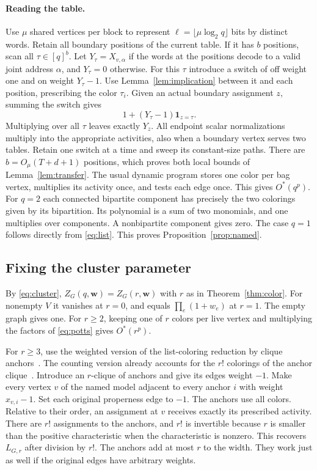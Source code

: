 \documentclass[11pt]{article}
\theoremstyle{definition}
\newcommand{\one}{\mathbf{1}}
\newcommand{\OO}{O^*}
\begin{document}
\paragraph{Reading the table.}
Use \(\mu\) shared vertices per block to represent \(\ell=\lfloor \mu\log_2 q\rfloor\) bits by distinct words. Retain all boundary positions of the current table. If it has \(b\) positions, scan all \(\tau\in[q]^b\). Let \(Y_\tau=X_{v,\alpha}\) if the words at the positions decode to a valid joint address \(\alpha\), and \(Y_\tau=0\) otherwise. For this \(\tau\) introduce a switch of off weight one and on weight \(Y_\tau-1\). Use Lemma~\ref{lem:implication} between it and each position, prescribing the color \(\tau_i\). Given an actual boundary assignment \(z\), summing the switch gives
\[
                      1+(Y_\tau-1)\one_{z=\tau}.
\]
Multiplying over all \(\tau\) leaves exactly \(Y_z\). All endpoint scalar normalizations multiply into the appropriate activities, also when a boundary vertex serves two tables. Retain one switch at a time and sweep its constant-size paths. There are \(b=O_\mu(T+d+1)\) positions, which proves both local bounds of Lemma~\ref{lem:transfer}. The usual dynamic program stores one color per bag vertex, multiplies its activity once, and tests each edge once. This gives \(\OO(q^p)\). For \(q=2\) each connected bipartite component has precisely the two colorings given by its bipartition. Its polynomial is a sum of two monomials, and one multiplies over components. A nonbipartite component gives zero. The case \(q=1\) follows directly from \eqref{eq:list}. This proves Proposition~\ref{prop:named}.

\subsection{Fixing the cluster parameter}
By \eqref{eq:cluster}, \(Z_G(q,\mathbf w)=Z_G(r,\mathbf w)\) with \(r\) as in Theorem~\ref{thm:color}. For nonempty \(V\) it vanishes at \(r=0\), and equals \(\prod_e(1+w_e)\) at \(r=1\). The empty graph gives one. For \(r\ge2\), keeping one of \(r\) colors per live vertex and multiplying the factors of \eqref{eq:potts} gives \(\OO(r^p)\).

For \(r\ge3\), use the weighted version of the list-coloring reduction by clique anchors~\cite[Section~4.2]{lms-width}. The counting version already accounts for the \(r!\) colorings of the anchor clique~\cite[Corollary~4.8]{fmr-counting}. Introduce an \(r\)-clique of anchors and give its edges weight \(-1\). Make every vertex \(v\) of the named model adjacent to every anchor \(i\) with weight \(x_{v,i}-1\). Set each original properness edge to \(-1\). The anchors use all colors. Relative to their order, an assignment at \(v\) receives exactly its prescribed activity. There are \(r!\) assignments to the anchors, and \(r!\) is invertible because \(r\) is smaller than the positive characteristic when the characteristic is nonzero. This recovers \(L_{G,r}\) after division by \(r!\). The anchors add at most \(r\) to the width. They work just as well if the original edges have arbitrary weights.
\end{document}
